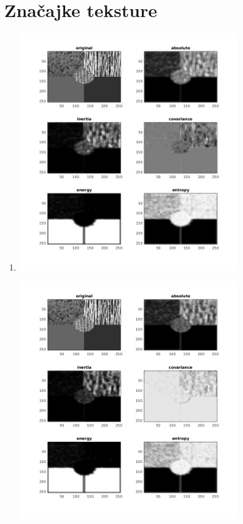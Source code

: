 \documentclass[12pt, a4]{report}
\begin{document}
\section{Značajke teksture}
\begin{enumerate}
	\item
		\begin{minipage}{\linewidth}
			\centering
			\includegraphics[width=0.75\textwidth]{texture22}
		\end{minipage}
		\begin{minipage}{\linewidth}
			\centering
			\includegraphics[width=0.75\textwidth]{texture44}

\end{minipage}
\end{enumerate}
\end{document}
